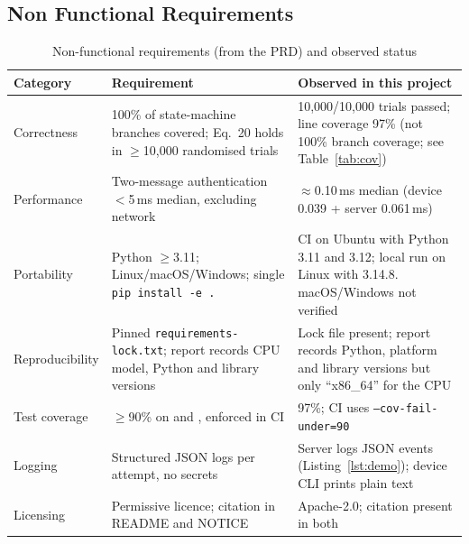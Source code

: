 \documentclass[12pt,a4paper,oneside]{report}
\numberwithin{equation}{chapter}
\begin{document}
\subsection{Non Functional Requirements}
\begin{table}[H]
\centering
\caption{Non-functional requirements (from the PRD) and observed status}
\label{tab:nfr}
\small
\begin{tabularx}{\textwidth}{|P{0.17\textwidth}|Y|Y|}
\hline
\textbf{Category} & \textbf{Requirement} & \textbf{Observed in this project}\\ \hline
Correctness & 100\% of state-machine branches covered; Eq.~20 holds in $\ge$10{,}000 randomised trials & 10{,}000/10{,}000 trials passed; line coverage 97\% (not 100\% branch coverage; see Table~\ref{tab:cov})\\ \hline
Performance & Two-message authentication $<$5\,ms median, excluding network & $\approx$0.10\,ms median (device 0.039 + server 0.061\,ms)\\ \hline
Portability & Python $\ge$3.11; Linux/macOS/Windows; single \texttt{pip install -e .} & CI on Ubuntu with Python 3.11 and 3.12; local run on Linux with 3.14.8. macOS/Windows not verified\\ \hline
Reproducibility & Pinned \texttt{requirements-lock.txt}; report records CPU model, Python and library versions & Lock file present; report records Python, platform and library versions but only ``x86\_64'' for the CPU\\ \hline
Test coverage & $\ge$90\% on  and , enforced in CI & 97\%; CI uses \texttt{--cov-fail-under=90}\\ \hline
Logging & Structured JSON logs per attempt, no secrets & Server logs JSON events (Listing~\ref{lst:demo}); device CLI prints plain text\\ \hline
Licensing & Permissive licence; citation in README and NOTICE & Apache-2.0; citation present in both\\ \hline
\end{tabularx}
\end{table}
\end{document}
